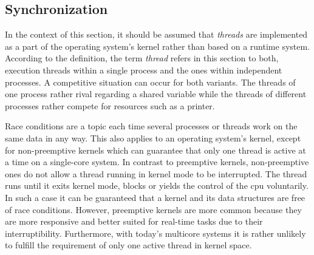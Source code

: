 \subsection{Synchronization}\label{sec:synchro}

In the context of this section, it should be assumed that \textit{threads} are implemented as a part of the operating system's kernel rather than based on a runtime system.
According to the definition, the term \textit{thread} refers in this section to both, execution threads within a single process and the ones within independent processes.
A competitive situation can occur for both variants. 
The threads of one process rather rival regarding a shared variable while the threads of different processes rather compete for resources such as a printer.

Race conditions are a topic each time several processes or threads work on the same data in any way.
This also applies to an operating system's kernel, except for non-preemptive kernels which can guarantee that only one thread is active at a time on a single-core system\cite{silberschatz2009operating}.
In contrast to preemptive kernels, non-preemptive ones do not allow a thread running in kernel mode to be interrupted. 
The thread runs until it exits kernel mode, blocks or yields the control of the \ac{cpu} voluntarily\cite{silberschatz2009operating}.
In such a case it can be guaranteed that a kernel and its data structures are free of race conditions.
However, preemptive kernels are more common because they are more responsive and better suited for real-time tasks due to their interruptibility\cite{silberschatz2009operating}.
Furthermore, with today's multicore systems it is rather unlikely to fulfill the requirement of only one active thread in kernel space.

